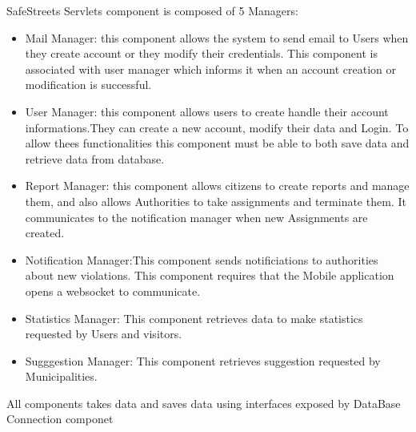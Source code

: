  SafeStreets Servlets component is composed of 5 Managers:
\begin{itemize}
\item Mail Manager: this component allows the system to send email to Users when they create account or they modify their credentials. This component is associated with user manager which informs it when an account creation or modification is successful.
\item User Manager: this component allows users to create handle their account informations.They can create a new account, modify their data and Login. To allow thees functionalities this component must be able to both save data and retrieve data from database.
\item Report Manager: this component allows citizens to create reports and manage them, and also allows Authorities to take assignments and terminate them. It communicates to the notification manager when new Assignments are created.
\item Notification Manager:This component sends notificiations to authorities about new violations. This component requires that the Mobile application opens a websocket to communicate. 
\item Statistics Manager: This component retrieves data to make  statistics requested by Users and visitors.
\item Sugggestion Manager: This component retrieves suggestion requested by Municipalities.
\end{itemize}
All components takes data and saves data using interfaces exposed by DataBase Connection componet
